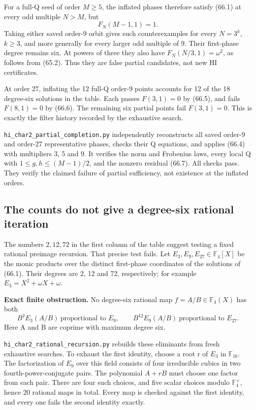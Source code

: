 \documentclass[11pt,reqno]{amsart}
\theoremstyle{plain}
\begin{document}
For a full-Q seed of order \(M\ge5\), the inflated phases
therefore satisfy (66.1) at every odd multiple \(N>M\), but
\begin{equation*}
 F_N(M-1,1)=1.
 \tag{66.7}
\end{equation*}
Taking either saved order-9 orbit gives such counterexamples for
every \(N=3^k\), \(k\ge3\), and more generally for every
larger odd multiple of 9. Their first-phase degree remains six.
At powers of three they also have
\(F_N(N/3,1)=\omega^2\), as follows from (65.2).
Thus they are false partial candidates, not new HI certificates.

At order 27, inflating the 12 full-Q order-9 points accounts for
12 of the 18 degree-six solutions in the table. Each passes
\(F(3,1)=0\) by (66.5), and fails \(F(8,1)=0\) by (66.6).
The remaining six partial points fail \(F(3,1)=0\). This is
exactly the filter history recorded by the exhaustive search.

\texttt{hi\_\allowbreak char2\_\allowbreak partial\_\allowbreak completion.py} independently reconstructs all saved
order-9 and order-27 representative phases, checks their Q equations,
and applies (66.4) with multipliers 3, 5 and 9. It verifies the norm
and Frobenius laws, every local Q with
\(1\le g,h\le(M-1)/2\), and the nonzero residual (66.7).
All checks pass. They verify the claimed failure of partial
sufficiency, not existence at the inflated orders.

\subsection{The counts do not give a degree-six rational iteration}\label{sec:66.3}

The numbers \(2,12,72\) in the first column of the table suggest
testing a fixed rational preimage recursion. That precise test fails.
Let \(E_3,E_9,E_{27}\in\mathbb F_4[X]\) be the monic products
over the distinct first-phase coordinates of the solutions of
(66.1). Their degrees are 2, 12 and 72, respectively; for example
\(E_3=X^2+\omega X+\omega\).

\textbf{Exact finite obstruction.} No degree-six rational map
\(f=A/B\in\mathbb F_4(X)\) has both
\begin{equation*}
 B^2E_3(A/B)\ \text{proportional to }E_9,
 \qquad
 B^{12}E_9(A/B)\ \text{proportional to }E_{27}.
 \tag{66.8}
\end{equation*}
Here A and B are coprime with maximum degree six.

\texttt{hi\_\allowbreak char2\_\allowbreak rational\_\allowbreak recursion.py} rebuilds these eliminants from fresh
exhaustive searches. To exhaust the first identity, choose a root r
of \(E_3\) in \(\mathbb F_{16}\). The factorization of
\(E_9\) over this field consists of four irreducible cubics in
two fourth-power-conjugate pairs. The polynomial \(A+rB\) must
choose one factor from each pair. There are four such choices, and
five scalar choices modulo \(\mathbb F_4^\times\), hence 20
rational maps in total. Every map is checked against the first
identity, and every one fails the second identity exactly.
\end{document}

